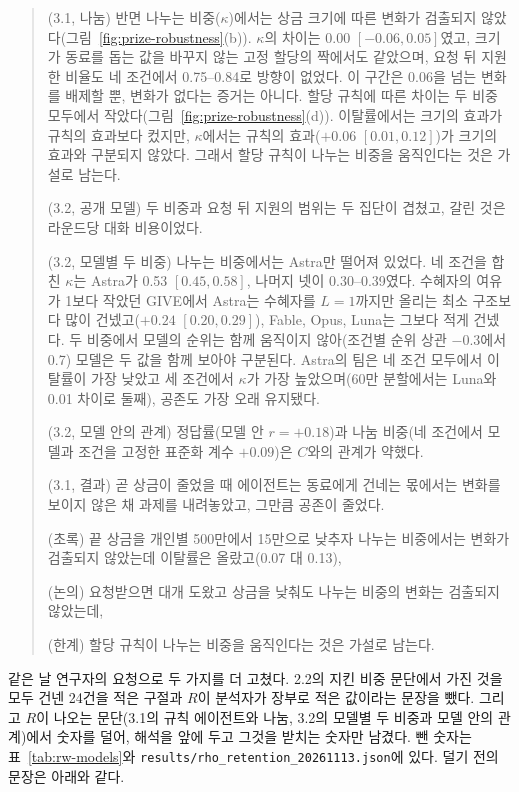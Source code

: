 \begin{quote}
{(3.1, 나눔) 반면 나누는 비중($\kappa$)에서는 상금 크기에 따른 변화가 검출되지 않았다(그림~\ref{fig:prize-robustness}(b)). $\kappa$의 차이는 $0.00$ $[-0.06,0.05]$였고, 크기가 동료를 돕는 값을 바꾸지 않는 고정 할당의 짝에서도 같았으며, 요청 뒤 지원한 비율도 네 조건에서 0.75--0.84로 방향이 없었다. 이 구간은 0.06을 넘는 변화를 배제할 뿐, 변화가 없다는 증거는 아니다. 할당 규칙에 따른 차이는 두 비중 모두에서 작았다(그림~\ref{fig:prize-robustness}(d)). 이탈률에서는 크기의 효과가 규칙의 효과보다 컸지만, $\kappa$에서는 규칙의 효과($+0.06$ $[0.01,0.12]$)가 크기의 효과와 구분되지 않았다. 그래서 할당 규칙이 나누는 비중을 움직인다는 것은 가설로 남는다.

(3.2, 공개 모델) 두 비중과 요청 뒤 지원의 범위는 두 집단이 겹쳤고, 갈린 것은 라운드당 대화 비용이었다.

(3.2, 모델별 두 비중) 나누는 비중에서는 Astra만 떨어져 있었다. 네 조건을 합친 $\kappa$는 Astra가 0.53 $[0.45,0.58]$, 나머지 넷이 0.30--0.39였다. 수혜자의 여유가 1보다 작았던 GIVE에서 Astra는 수혜자를 $L=1$까지만 올리는 최소 구조보다 많이 건넸고($+0.24$ $[0.20,0.29]$), Fable, Opus, Luna는 그보다 적게 건넸다. 두 비중에서 모델의 순위는 함께 움직이지 않아(조건별 순위 상관 $-0.3$에서 0.7) 모델은 두 값을 함께 보아야 구분된다. Astra의 팀은 네 조건 모두에서 이탈률이 가장 낮았고 세 조건에서 $\kappa$가 가장 높았으며(60만 분할에서는 Luna와 0.01 차이로 둘째), 공존도 가장 오래 유지됐다.

(3.2, 모델 안의 관계) 정답률(모델 안 $r=+0.18$)과 나눔 비중(네 조건에서 모델과 조건을 고정한 표준화 계수 $+0.09$)은 $C$와의 관계가 약했다.

(3.1, 결과) 곧 상금이 줄었을 때 에이전트는 동료에게 건네는 몫에서는 변화를 보이지 않은 채 과제를 내려놓았고, 그만큼 공존이 줄었다.

(초록) 끝 상금을 개인별 500만에서 15만으로 낮추자 나누는 비중에서는 변화가 검출되지 않았는데 이탈률은 올랐고(0.07 대 0.13),

(논의) 요청받으면 대개 도왔고 상금을 낮춰도 나누는 비중의 변화는 검출되지 않았는데,

(한계) 할당 규칙이 나누는 비중을 움직인다는 것은 가설로 남는다.
}
\end{quote}

같은 날 연구자의 요청으로 두 가지를 더 고쳤다. 2.2의 지킨 비중 문단에서 가진 것을 모두 건넨 24건을 적은 구절과 $R$이 분석자가 장부로 적은 값이라는 문장을 뺐다. 그리고 $R$이 나오는 문단(3.1의 규칙 에이전트와 나눔, 3.2의 모델별 두 비중과 모델 안의 관계)에서 숫자를 덜어, 해석을 앞에 두고 그것을 받치는 숫자만 남겼다. 뺀 숫자는 표~\ref{tab:rw-models}와 \texttt{results/rho\_retention\_20261113.json}에 있다. 덜기 전의 문장은 아래와 같다.

